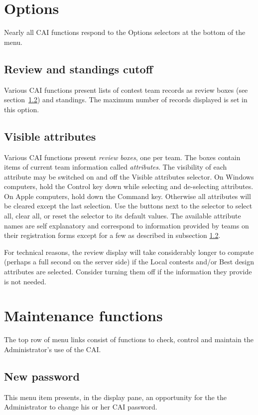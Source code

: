 \documentclass[11pt,letterpaper]{refart}
\def\ui#1{\textsf{#1}}
\begin{document}
\section{Options}
Nearly all CAI functions respond to the \ui{Options} selectors 
at the bottom of the menu. 

\subsection{Review and standings cutoff}
Various CAI functions present lists of contest team records as review boxes 
(see section~\ref{sec:reviewboxes}) and 
standings. The maximum number of records displayed is set in this option.
 
\subsection{Visible attributes}
\label{sec:reviewboxes}
Various CAI functions present \emph{review boxes}, one per team. The boxes
contain items of current team information called \emph{attributes}. 
The visibility of each attribute may be switched on and off the 
\ui{Visible attributes} selector. On Windows computers, 
hold the Control key down while selecting and de-selecting attributes. On Apple
computers, hold down the Command key. Otherwise
all attributes will be cleared except the last selection. Use the buttons next to 
the selector to select all, clear all, or reset the selector to its default values. The
available attribute names are self explanatory and correspond to information
provided by teams on their registration forms except for a few as described
in subsection \ref{sec:reviewboxes}.

For technical reasons, the review display will take considerably longer to compute
(perhaps a full second on the server side) if the \ui{Local contests}  and/or 
\ui{Best design} attributes are selected. Consider turning them off if the
information they provide is not needed.

\section{Maintenance functions}
The top row of menu links consist of functions to check, control and maintain the 
Administrator's use of the CAI.

\subsection{New password}
This menu item presents, in the display pane, an opportunity for the
the Administrator to change his or her CAI password.
\end{document}
